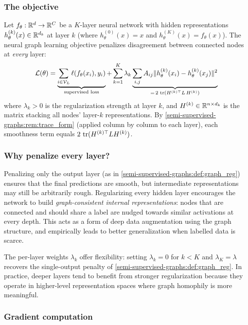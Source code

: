 \begin{notechapter}
\subsubsection*{The objective}

Let $f_\theta: \mathbb{R}^d \to \mathbb{R}^C$ be a $K$-layer neural network with hidden
representations $h_\theta^{(k)}(x) \in \mathbb{R}^{d_k}$ at layer $k$ (where
$h_\theta^{(0)}(x) = x$ and $h_\theta^{(K)}(x) = f_\theta(x)$). The neural
graph learning objective penalizes disagreement between connected nodes at
\emph{every} layer:
\begin{equation}
\label{semi-supervised-graphs:eq:neural_graph}
\mathcal{L}(\theta) = \underbrace{\sum_{i \in \mathcal{V}_L}
\ell(f_\theta(x_i), y_i)}_{\text{supervised loss}} +
\sum_{k=1}^K \lambda_k
\underbrace{\sum_{i,j}A_{ij}\|h_\theta^{(k)}(x_i) -
h_\theta^{(k)}(x_j)\|^2}_{= \,2\,\operatorname{tr}(H^{(k)\top} L\, H^{(k)})}
\end{equation}
where $\lambda_k > 0$ is the regularization strength at layer $k$, and
$H^{(k)} \in \mathbb{R}^{n \times d_k}$ is the matrix stacking all nodes' layer-$k$
representations. By \cref{semi-supervised-graphs:rem:trace_form} (applied column by column to
each layer), each smoothness term equals $2\,\operatorname{tr}(H^{(k)\top} L H^{(k)})$.

\subsubsection*{Why penalize every layer?}

Penalizing only the output layer (as in \cref{semi-supervised-graphs:def:graph_reg}) ensures
that the final predictions are smooth, but intermediate representations may
still be arbitrarily rough. Regularizing every hidden layer encourages the
network to build \emph{graph-consistent internal representations}: nodes that
are connected and should share a label are nudged towards similar activations at
every depth. This acts as a form of deep data augmentation using the graph
structure, and empirically leads to better generalization when labelled data is
scarce.

The per-layer weights $\lambda_k$ offer flexibility: setting $\lambda_k = 0$
for $k < K$ and $\lambda_K = \lambda$ recovers the single-output penalty of
\cref{semi-supervised-graphs:def:graph_reg}. In practice, deeper layers tend to benefit
from stronger regularization because they operate in higher-level representation
spaces where graph homophily is more meaningful.

\subsubsection*{Gradient computation}


\end{notechapter}
